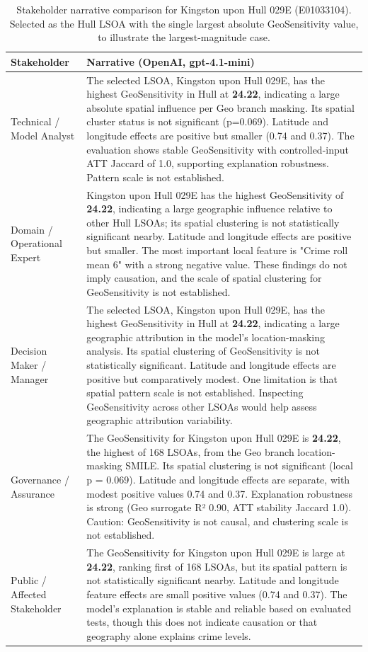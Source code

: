 \begin{table}[H]
\centering
\caption{Stakeholder narrative comparison for Kingston upon Hull 029E (E01033104). Selected as the Hull LSOA with the single largest absolute GeoSensitivity value, to illustrate the largest-magnitude case.}
\label{tab:stakeholder_narratives_top_magnitude}
\small
\begin{tabularx}{\textwidth}{p{} X}
\toprule
Stakeholder & Narrative (OpenAI, {\ttfamily gpt-4.1-mini}) \\
\midrule
Technical / Model Analyst &
The selected LSOA, Kingston upon Hull 029E, has the highest GeoSensitivity in Hull at \textbf{24.22}, indicating a large absolute spatial influence per Geo branch masking. Its spatial cluster status is not significant (p=0.069). Latitude and longitude effects are positive but smaller (0.74 and 0.37). The evaluation shows stable GeoSensitivity with controlled-input ATT Jaccard of 1.0, supporting explanation robustness. Pattern scale is not established. \\
Domain / Operational Expert &
Kingston upon Hull 029E has the highest GeoSensitivity of \textbf{24.22}, indicating a large geographic influence relative to other Hull LSOAs; its spatial clustering is not statistically significant nearby. Latitude and longitude effects are positive but smaller. The most important local feature is "Crime roll mean 6" with a strong negative value. These findings do not imply causation, and the scale of spatial clustering for GeoSensitivity is not established. \\
Decision Maker / Manager &
The selected LSOA, Kingston upon Hull 029E, has the highest GeoSensitivity in Hull at \textbf{24.22}, indicating a large geographic attribution in the model’s location-masking analysis. Its spatial clustering of GeoSensitivity is not statistically significant. Latitude and longitude effects are positive but comparatively modest. One limitation is that spatial pattern scale is not established. Inspecting GeoSensitivity across other LSOAs would help assess geographic attribution variability. \\
Governance / Assurance &
The GeoSensitivity for Kingston upon Hull 029E is \textbf{24.22}, the highest of 168 LSOAs, from the Geo branch location-masking SMILE. Its spatial clustering is not significant (local p = 0.069). Latitude and longitude effects are separate, with modest positive values 0.74 and 0.37. Explanation robustness is strong (Geo surrogate R² 0.90, ATT stability Jaccard 1.0). Caution: GeoSensitivity is not causal, and clustering scale is not established. \\
Public / Affected Stakeholder &
The GeoSensitivity for Kingston upon Hull 029E is large at \textbf{24.22}, ranking first of 168 LSOAs, but its spatial pattern is not statistically significant nearby. Latitude and longitude feature effects are small positive values (0.74 and 0.37). The model’s explanation is stable and reliable based on evaluated tests, though this does not indicate causation or that geography alone explains crime levels. \\
\bottomrule
\end{tabularx}
\end{table}

